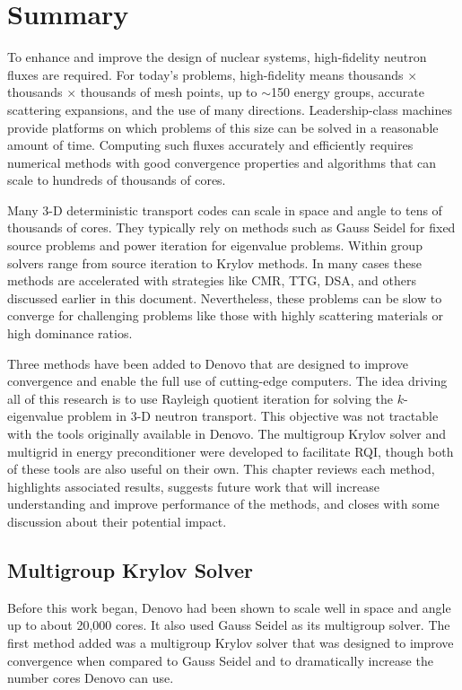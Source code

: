 
\chapter{Summary}
\label{sec:Chp5}
To enhance and improve the design of nuclear systems, high-fidelity neutron fluxes are required. For today's problems, high-fidelity means thousands $\times$ thousands $\times$ thousands of mesh points, up to $\sim$150 energy groups, accurate scattering expansions, and the use of many directions. Leadership-class machines provide platforms on which problems of this size can be solved in a reasonable amount of time. Computing such fluxes accurately and efficiently requires numerical methods with good convergence properties and algorithms that can scale to hundreds of thousands of cores. 

Many 3-D deterministic transport codes can scale in space and angle to tens of thousands of cores. They typically rely on methods such as Gauss Seidel for fixed source problems and power iteration for eigenvalue problems. Within group solvers range from source iteration to Krylov methods. In many cases these methods are accelerated with strategies like CMR, TTG, DSA, and others discussed earlier in this document. Nevertheless, these problems can be slow to converge for challenging problems like those with highly scattering materials or high dominance ratios. 

Three methods have been added to Denovo that are designed to improve convergence and enable the full use of cutting-edge computers. The idea driving all of this research is to use Rayleigh quotient iteration for solving the $k$-eigenvalue problem in 3-D neutron transport. This objective was not tractable with the tools originally available in Denovo. The multigroup Krylov solver and multigrid in energy preconditioner were developed to facilitate RQI, though both of these tools are also useful on their own. This chapter reviews each method, highlights associated results, suggests future work that will increase understanding and improve performance of the methods, and closes with some discussion about their potential impact. 

\section{Multigroup Krylov Solver}
Before this work began, Denovo had been shown to scale well in space and angle up to about 20,000 cores. It also used Gauss Seidel as its multigroup solver. The first method added was a multigroup Krylov solver that was designed to improve convergence when compared to Gauss Seidel and to dramatically increase the number cores Denovo can use. 

